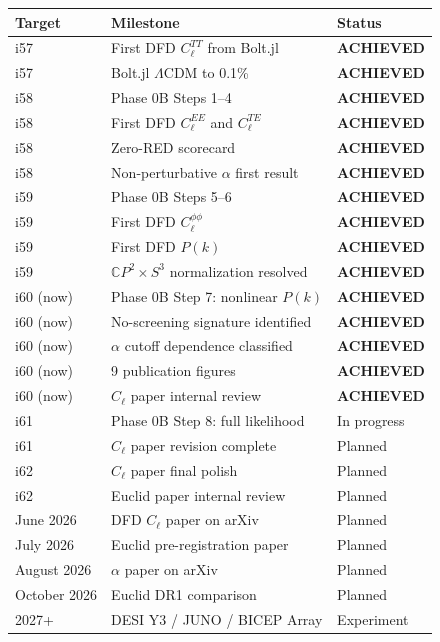 \documentclass[11pt,a4paper]{article}
\newcommand{\CP}{\mathbb{C}P}
\begin{document}
\begin{center}
\begin{longtable}{lll}
\toprule
\textbf{Target} & \textbf{Milestone} & \textbf{Status} \\
\midrule
i57 & First DFD $C_\ell^{TT}$ from Bolt.jl & \textbf{ACHIEVED} \\
i57 & Bolt.jl $\Lambda$CDM to 0.1\% & \textbf{ACHIEVED} \\
i58 & Phase 0B Steps 1--4 & \textbf{ACHIEVED} \\
i58 & First DFD $C_\ell^{EE}$ and $C_\ell^{TE}$ & \textbf{ACHIEVED} \\
i58 & Zero-RED scorecard & \textbf{ACHIEVED} \\
i58 & Non-perturbative $\alpha$ first result & \textbf{ACHIEVED} \\
i59 & Phase 0B Steps 5--6 & \textbf{ACHIEVED} \\
i59 & First DFD $C_\ell^{\phi\phi}$ & \textbf{ACHIEVED} \\
i59 & First DFD $P(k)$ & \textbf{ACHIEVED} \\
i59 & $\CP^2 \times S^3$ normalization resolved & \textbf{ACHIEVED} \\
i60 (now) & Phase 0B Step 7: nonlinear $P(k)$ & \textbf{ACHIEVED} \\
i60 (now) & No-screening signature identified & \textbf{ACHIEVED} \\
i60 (now) & $\alpha$ cutoff dependence classified & \textbf{ACHIEVED} \\
i60 (now) & 9 publication figures & \textbf{ACHIEVED} \\
i60 (now) & $C_\ell$ paper internal review & \textbf{ACHIEVED} \\
i61 & Phase 0B Step 8: full likelihood & In progress \\
i61 & $C_\ell$ paper revision complete & Planned \\
i62 & $C_\ell$ paper final polish & Planned \\
i62 & Euclid paper internal review & Planned \\
June 2026 & DFD $C_\ell$ paper on arXiv & Planned \\
July 2026 & Euclid pre-registration paper & Planned \\
August 2026 & $\alpha$ paper on arXiv & Planned \\
October 2026 & Euclid DR1 comparison & Planned \\
2027+ & DESI Y3 / JUNO / BICEP Array & Experiment \\
\bottomrule
\end{longtable}
\end{center}
\end{document}
